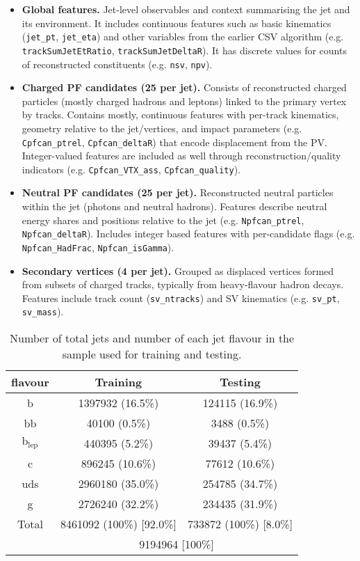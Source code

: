 \begin{itemize}
  \item \textbf{Global features.} Jet-level observables and context summarising the jet and its environment. It includes continuous features such as basic kinematics (\texttt{jet\_pt}, \texttt{jet\_eta}) and other variables from the earlier CSV algorithm (e.g. \texttt{trackSumJetEtRatio}, \texttt{trackSumJetDeltaR}). It has discrete values for counts of reconstructed constituents (e.g. \texttt{nsv}, \texttt{npv}).
  \item \textbf{Charged PF candidates (25 per jet).} Consists of reconstructed charged particles (mostly charged hadrons and leptons) linked to the primary vertex by tracks. Contains mostly, continuous features with per-track kinematics, geometry relative to the jet/vertices, and impact parameters (e.g. \texttt{Cpfcan\_ptrel},  \texttt{Cpfcan\_deltaR}) that encode displacement from the PV. Integer-valued features are included as well through reconstruction/quality indicators (e.g. \texttt{Cpfcan\_VTX\_ass}, \texttt{Cpfcan\_quality}).
  \item \textbf{Neutral PF candidates (25 per jet).} Reconstructed neutral particles within the jet (photons and neutral hadrons). Features describe neutral energy shares and positions relative to the jet (e.g. \texttt{Npfcan\_ptrel}, \texttt{Npfcan\_deltaR}). Includes integer based features with per-candidate flags (e.g. \texttt{Npfcan\_HadFrac}, \texttt{Npfcan\_isGamma}).
  \item \textbf{Secondary vertices (4 per jet).} Grouped as displaced vertices formed from subsets of charged tracks, typically from heavy-flavour hadron decays. Features include track count (\texttt{sv\_ntracks}) and SV kinematics (e.g. \texttt{sv\_pt}, \texttt{sv\_mass}).
\end{itemize}

\begin{table}[ht]
\centering
\caption{Number of total jets and number of each jet flavour in the sample used for training and testing.}
\begin{tabular}{|c|c|c|}
\hline
\textbf{flavour} & \textbf{Training} & \textbf{Testing} \\
\hline
b                       & 1397932 (16.5\%) & 124115 (16.9\%)\\
bb                      & 40100   (0.5\%)  & 3488   (0.5\%)\\
$\text{b}_{\text{lep}}$ & 440395  (5.2\%)  & 39437  (5.4\%)\\
c                       & 896245  (10.6\%) & 77612  (10.6\%)\\
uds                     & 2960180 (35.0\%) & 254785 (34.7\%)\\
g                       & 2726240 (32.2\%) & 234435 (31.9\%)\\
\hline
Total & 8461092 (100\%) [92.0\%] & 733872 (100\%) [8.0\%] \\
\hline
      &    \multicolumn{2}{c|}{9194964 [100\%]}            \\
\hline
\end{tabular}
\label{tab:dataset}
\end{table}

